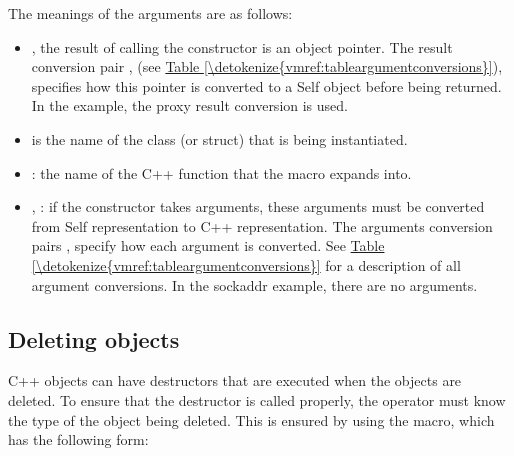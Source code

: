 \documentclass[letterpaper,10pt,english]{sphinxmanual}
\begin{document}
\begin{sphinxVerbatim}[commandchars=\\\{\}]
   
\end{sphinxVerbatim}

The meanings of the  arguments are as follows:
\begin{itemize}
\item {} 
,  the result of calling the constructor is an object pointer. The result
conversion pair ,  (see \hyperref[\detokenize{vmref:tableargumentconversions}]{Table \ref{\detokenize{vmref:tableargumentconversions}}}), specifies how this pointer is converted
to a Self object before being returned. In the  example, the proxy result conversion
is used.

\item {} 
 is the name of the class (or struct) that is being instantiated.

\item {} 
: the name of the C++ function that the  macro expands into.

\item {} 
, : if the constructor takes arguments, these arguments must be converted from Self
representation to C++ representation. The arguments conversion pairs ,  specify how
each argument is converted. See \hyperref[\detokenize{vmref:tableargumentconversions}]{Table \ref{\detokenize{vmref:tableargumentconversions}}} for a description of all argument conversions. In
the sockaddr example, there are no arguments.

\end{itemize}


\subsection{Deleting objects}
\label{\detokenize{vmref:deleting-objects}}
C++ objects can have destructors that are executed when the objects are deleted. To ensure that the
destructor is called properly, the  operator must know the type of the object being deleted.
This is ensured by using the  macro, which has the following form:
\end{document}

